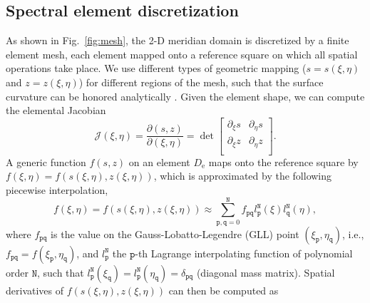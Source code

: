 \documentclass[extra]{gji}
\begin{document}
\subsection{Spectral element discretization}
As shown in Fig.~\ref{fig:mesh}, the 2-D meridian domain is discretized 
by a finite element mesh, each element mapped onto a reference square 
on which all spatial operations take place. 
We use different types of geometric mapping 
($s=s\left(\xi,\eta\right)$ and $z=z\left(\xi,\eta\right)$)
for different regions of the mesh, such that the surface curvature can be
honored analytically \cite[]{nissen2007sem}.
Given the element shape, we can compute the elemental Jacobian
\begin{equation}
  \mathcal{J}\left(\xi,\eta\right)=\frac{\partial\left(s,z\right)}{\partial\left(\xi,\eta\right)}=\det 
  \begin{bmatrix}
    \partial_\xi s & \partial_\eta s \\
    \partial_\xi z & \partial_\eta z \\
  \end{bmatrix}.
  \label{eq:jacob}
\end{equation}
A generic function $f\left(s,z\right)$ on an element $D_\text{e}$ maps onto the 
reference square by $f\left(\xi,\eta\right)=f\left(s\left(\xi,\eta\right),z\left(\xi,\eta\right)\right)$, which is
approximated by the following piecewise interpolation,
\begin{equation}
  f\left(\xi,\eta\right)=f\left(s\left(\xi,\eta\right),z\left(\xi,\eta\right)\right) \approx 
  \sum_{\mathtt{p},\mathtt{q}=0}^{\mathtt{N}}
  f_{\mathtt{p}\mathtt{q}} l_{\mathtt{p}}^{\mathtt{N}}\left(\xi\right) 
  l_{\mathtt{q}}^{\mathtt{N}}\left(\eta\right),
\end{equation} 
where $f_{\mathtt{p}\mathtt{q}}$ is the value on the Gauss-Lobatto-Legendre
(GLL) point $\left(\xi_\mathtt{p},\eta_\mathtt{q}\right)$,
i.e., $f_{\mathtt{p}\mathtt{q}} = f\left(\xi_\mathtt{p},\eta_\mathtt{q}\right)$,
and $l_{\mathtt{p}}^{\mathtt{N}}$
the $\mathtt{p}$-th Lagrange interpolating function of polynomial order
$\mathtt{N}$, such that 
$l_{\mathtt{p}}^{\mathtt{N}}\left(\xi_\mathtt{q}\right)=
l_{\mathtt{p}}^{\mathtt{N}}\left(\eta_\mathtt{q}\right)=\delta_{\mathtt{p}\mathtt{q}}$ 
(diagonal mass matrix). 
Spatial derivatives of $f\left(s\left(\xi,\eta\right),z\left(\xi,\eta\right)\right)$ can then be computed as 
\end{document}
